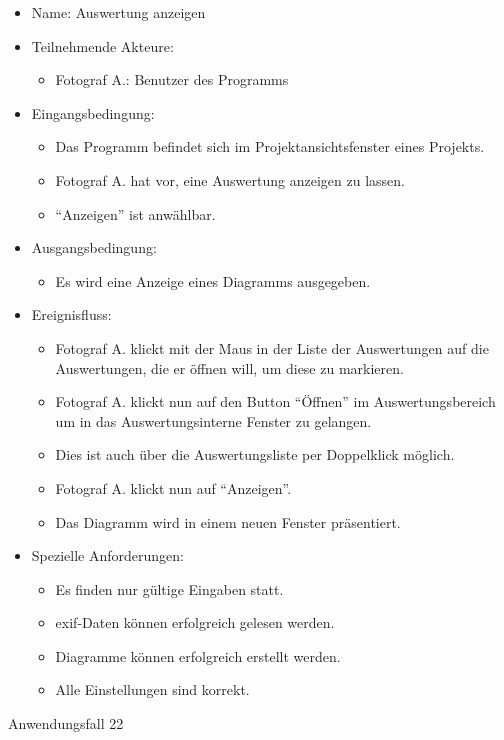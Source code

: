 \begin{itemize}
\item Name: Auswertung anzeigen 
\item Teilnehmende Akteure:
\begin{itemize}
\item Fotograf A.: Benutzer des Programms
\end{itemize}
\item Eingangsbedingung:
\begin{itemize}
\item Das Programm befindet sich im Projektansichtsfenster eines Projekts.
\item Fotograf A. hat vor, eine Auswertung anzeigen zu lassen.
\item "`Anzeigen"' ist anwählbar.
\end{itemize}
\item Ausgangsbedingung:
\begin{itemize}
\item Es wird eine Anzeige eines Diagramms ausgegeben.
\end{itemize}
\item Ereignisfluss:
\begin{itemize}
\item Fotograf A. klickt mit der Maus in der Liste der Auswertungen auf die Auswertungen, die er öffnen will, um diese zu markieren.
\item Fotograf A. klickt nun auf den Button "`Öffnen"' im Auswertungsbereich um in das Auswertungsinterne Fenster zu gelangen.
\item Dies ist auch über die Auswertungsliste per Doppelklick möglich.
\item Fotograf A. klickt nun auf "`Anzeigen"'.
\item Das Diagramm wird in einem neuen Fenster präsentiert.
\end{itemize}
\item Spezielle Anforderungen:
\begin{itemize}
\item Es finden nur gültige Eingaben statt.
\item \gls{exif}-Daten können erfolgreich gelesen werden.
\item Diagramme können erfolgreich erstellt werden.
\item Alle Einstellungen sind korrekt.
\end{itemize}
\end{itemize}
 
\begin{description}
\item[Anwendungsfall 22]
\end{description}
 
